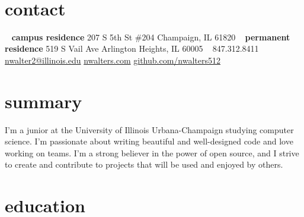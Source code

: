 \documentclass[nofooter]{resume}
\begin{document}


\begin{aside} %
~\vspace{-0.42cm} %
\section{contact}
\vspace{-0.16cm} %
~
\textbf{campus residence}
207 S 5th St \#204
Champaign, IL
61820
~
\textbf{permanent residence}
519 S Vail Ave
Arlington Heights, IL
60005
~
847.312.8411
~
\href{mailto:nwalter2@illinois.edu}{nwalter2@illinois.edu}
\href{http://www.nwalters.com}{nwalters.com}
\href{http://github.com/nwalters512}{github.com/nwalters512}
\end{aside}


\section{summary}

I'm a junior at the University of Illinois Urbana-Champaign studying computer science.  I'm passionate about writing beautiful and well-designed code and love working on teams. I'm a strong believer in the power of open source, and I strive to create and contribute to projects that will be used and enjoyed by others.


\section{education}
\end{document}
